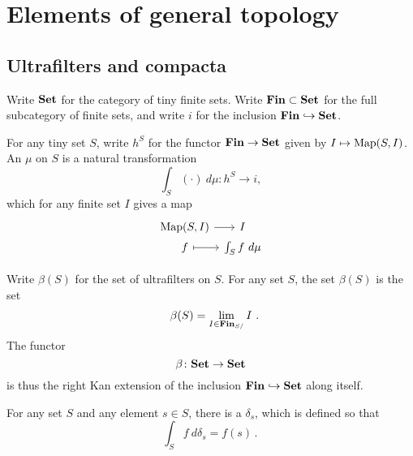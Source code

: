 
\section{Elements of general topology}

\subsection{Ultrafilters and compacta}

\begin{ntn}
	Write $ \textbf{\textup{Set}} $ for the category of tiny finite sets.
	Write $ \textbf{\textup{Fin}} \subset \textbf{\textup{Set}} $ for the full subcategory of finite sets,
	and write $ i $ for the inclusion $ \textbf{\textup{Fin}} \hookrightarrow \textbf{\textup{Set}}$.
\end{ntn}

\begin{dfn}
	For any tiny set $ S $, write $ h^S $ for the functor $ \textbf{\textup{Fin}} \to \textbf{\textup{Set}} $ given by $ I  \mapsto \operatorname{Map}(S, I) $.
	An  $ \mu $ on $ S $ is a natural transformation
	\[
		\int_S (\cdot) \ d\mu \colon h^S \to i \comma
	\]
	which for any finite set $I$ gives a map
	\[
		\begin{tikzcd}[column sep={1ex}, row sep={0ex}]
			\Map(S, I) \ar[r] & I \\
			f \ar[r, mapsto] & \int_S f \ d \mu
		\end{tikzcd}
	\]

	Write $ \beta (S) $ for the set of ultrafilters on $ S $.
	For any set $ S $, the set $ \beta(S) $ is the set
	\[
		\beta(S) = \lim_{I \in \Fin_{S/}} I \period
	\]
	The functor
	\[
		\beta \colon \textbf{\textup{Set}} \to \textbf{\textup{Set}}
	\]
	is thus the right Kan extension of the inclusion $ \textbf{\textup{Fin}} \hookrightarrow \textbf{\textup{Set}} $ along itself.
\end{dfn}

\begin{exm}
	For any set $ S $ and any element $ s \in S $, there is a  $ \delta_s $, which is defined so that
	\[
		\int_S f \ d \delta_s = f(s) \period
	\]
\end{exm}

